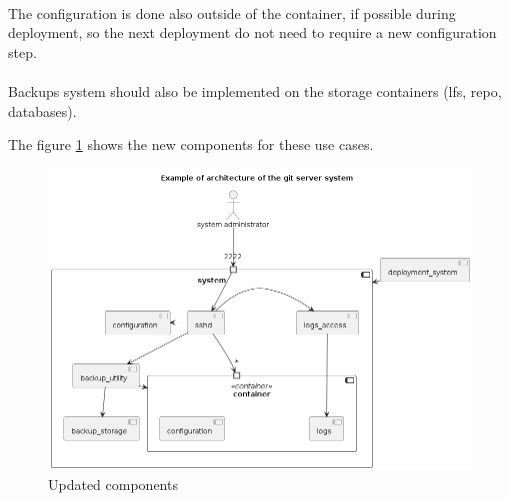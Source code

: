 \paragraph{}
The configuration is done also outside of the container, if possible during deployment, so the next deployment do not need to require a new configuration step.

\paragraph{}
Backups system should also be implemented on the storage containers (lfs, repo, databases). 

The figure \ref{fig:components_v2} shows the new components for these use cases. 

\begin{figure}[ht]
    \centering
    \includegraphics[width=\textwidth]{iteration_01/diagrams/components.png}
    \caption{Updated components}
    \label{fig:components_v2}
\end{figure}

